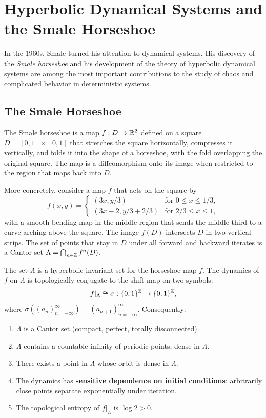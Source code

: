 \section{Hyperbolic Dynamical Systems and the Smale Horseshoe}

In the 1960s, Smale turned his attention to dynamical systems. His discovery of the \textit{Smale horseshoe} and his development of the theory of hyperbolic dynamical systems are among the most important contributions to the study of chaos and complicated behavior in deterministic systems.

\subsection{The Smale Horseshoe}

The Smale horseshoe is a map \(f: D \to \mathbb{R}^2\) defined on a square \(D = [0,1] \times [0,1]\) that stretches the square horizontally, compresses it vertically, and folds it into the shape of a horseshoe, with the fold overlapping the original square. The map is a diffeomorphism onto its image when restricted to the region that maps back into \(D\).

More concretely, consider a map \(f\) that acts on the square by
\[
f(x,y) = \begin{cases}
(3x, y/3) & \text{for } 0 \leq x \leq 1/3,\\[2mm]
(3x-2, y/3+2/3) & \text{for } 2/3 \leq x \leq 1,
\end{cases}
\]
with a smooth bending map in the middle region that sends the middle third to a curve arching above the square. The image \(f(D)\) intersects \(D\) in two vertical strips. The set of points that stay in \(D\) under all forward and backward iterates is a Cantor set \(\Lambda = \bigcap_{n \in \mathbb{Z}} f^n(D)\).

\begin{theorem}
The set \(\Lambda\) is a hyperbolic invariant set for the horseshoe map \(f\). The dynamics of \(f\) on \(\Lambda\) is topologically conjugate to the shift map on two symbols:
\[
f|_\Lambda \cong \sigma: \{0,1\}^{\mathbb{Z}} \to \{0,1\}^{\mathbb{Z}},
\]
where \(\sigma((a_n)_{n=-\infty}^\infty) = (a_{n+1})_{n=-\infty}^\infty\). Consequently:
\begin{enumerate}
    \item \(\Lambda\) is a Cantor set (compact, perfect, totally disconnected).
    \item \(\Lambda\) contains a countable infinity of periodic points, dense in \(\Lambda\).
    \item There exists a point in \(\Lambda\) whose orbit is dense in \(\Lambda\).
    \item The dynamics has \textbf{sensitive dependence on initial conditions}: arbitrarily close points separate exponentially under iteration.
    \item The topological entropy of \(f|_\Lambda\) is \(\log 2 > 0\).
\end{enumerate}
\end{theorem}

